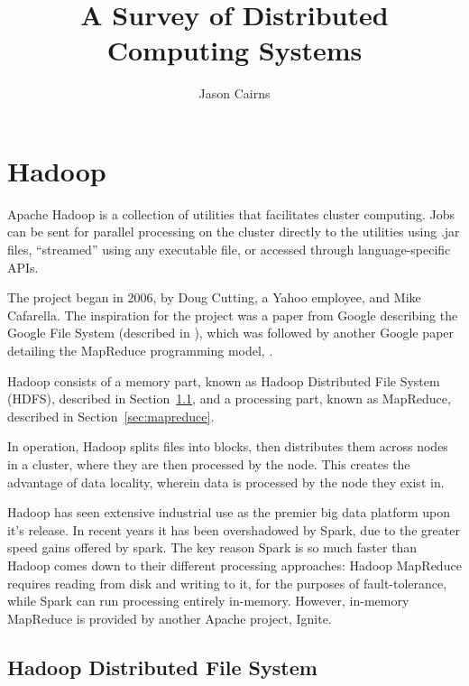 \documentclass[10pt,a4paper]{article}
\begin{document}
\title{A Survey of Distributed Computing Systems}
\author{Jason Cairns}
  
\maketitle{}
\tableofcontents{}

\section{Hadoop}
\label{sec:hadoop-1}

Apache Hadoop is a collection of utilities that facilitates cluster
computing. Jobs can be sent for parallel processing on the cluster
directly to the utilities using .jar files, ``streamed'' using any
executable file, or accessed through language-specific APIs.

The project began in 2006, by Doug Cutting, a Yahoo employee, and Mike
Cafarella. The inspiration for the project was a paper from Google
describing the Google File System (described in
\textcite{ghemawat2003google}), which was followed by another Google
paper detailing the MapReduce programming model,
\textcite{dean2004mapreduce}.

Hadoop consists of a memory part, known as Hadoop Distributed File
System (HDFS), described in Section~\ref{sec:hdfs}, and a processing part,
known as MapReduce, described in Section~\ref{sec:mapreduce}.

In operation, Hadoop splits files into blocks, then distributes them
across nodes in a cluster, where they are then processed by the node.
This creates the advantage of data locality, wherein data is processed
by the node they exist in.

Hadoop has seen extensive industrial use as the premier big data
platform upon it's release. In recent years it has been overshadowed
by Spark, due to the greater speed gains offered by spark. The key
reason Spark is so much faster than Hadoop comes down to their
different processing approaches: Hadoop MapReduce requires reading
from disk and writing to it, for the purposes of fault-tolerance,
while Spark can run processing entirely in-memory. However, in-memory
MapReduce is provided by another Apache project,
Ignite\cite{zheludkov2017high}.

\subsection{Hadoop Distributed File System}
\label{sec:hdfs}
\end{document}
